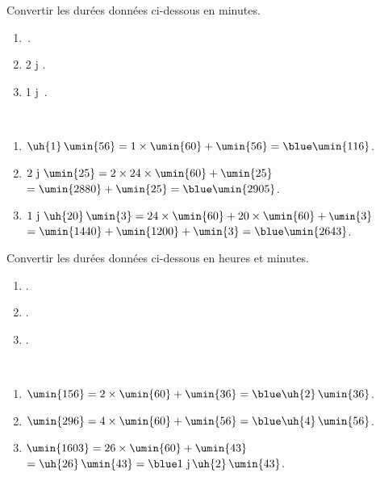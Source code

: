 \begin{colonne*exercice}
\bigskip
 
 
\begin{exercice} %
   Convertir les durées données ci-dessous en minutes.
   \begin{enumerate}
      \item {}\,.
      \item 2  j .
      \item 1 j \,.
   \end{enumerate}
\end{exercice}

\begin{corrige}
   \ \\ [-5mm]
   \begin{enumerate}
      \item $\uh{1}\,\umin{56} =1\times\umin{60}+\umin{56} =\blue \umin{116}$.
      \item $2\text{ j } \umin{25} =2\times24\times\umin{60}+\umin{25}$ \\
         \quad $=\umin{2880}+\umin{25} =\blue \umin{2905}$.
      \item $1\text{ j } \uh{20}\,\umin{3} =24\times\umin{60}+20\times\umin{60}+\small\umin{3}$ \\
         \quad $=\umin{1440}+\umin{1200}+\umin{3} =\blue \umin{2643}$.
   \end{enumerate}
\end{corrige}


\bigskip

\begin{exercice} %
   Convertir les durées données ci-dessous en heures et minutes.
   \begin{enumerate}
      \item {}.
      \item {}.
      \item {}.
   \end{enumerate}
\end{exercice}

\begin{corrige}
   \ \\ [-5mm]
   \begin{enumerate}
      \item $\umin{156} =2\times\umin{60}+\umin{36} =\blue \uh{2}\,\umin{36}$.
      \item $\umin{296} =4\times\umin{60}+\umin{56} =\blue \uh{4}\,\umin{56}$.
      \item $\umin{1603} =26\times\umin{60}+\umin{43}$ \\
         \quad $=\uh{26}\,\umin{43} =\blue 1\text{ j}\,\uh{2}\,\umin{43}$.
   \end{enumerate}
\end{corrige}


\end{colonne*exercice}
